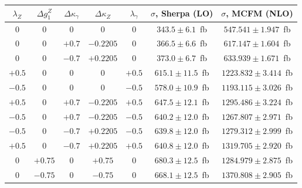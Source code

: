 \begin{table}[!ht]
  \begin{center}
  \begin{tabular} {|c c c|c c|c|c|}
\hline
  $\lambda_Z$ & $\Delta g^Z_1$ & $\Delta\kappa_{\gamma}$ & $\Delta\kappa_Z$ & $\lambda_{\gamma}$ & $\sigma$, Sherpa (LO) & $\sigma$, MCFM (NLO)\\
  \hline
  0           & 0              & 0                       & 0                & 0               &  $343.5\pm6.1$~fb  &  $547.541\pm1.947$~fb \\
  0           & 0              & $+0.7$                  & $-0.2205$        & 0               &  $366.5\pm6.6$~fb  &  $617.147\pm1.604$~fb \\
  0           & 0              & $-0.7$                  & $+0.2205$        & 0               &  $373.0\pm6.7$~fb  &  $633.939\pm1.671$~fb \\
  $+0.5$      & 0              & 0                       & 0                & $+0.5$          &  $615.1\pm11.5$~fb & $1223.832\pm3.414$~fb \\
  $-0.5$      & 0              & 0                       & 0                & $-0.5$          &  $578.0\pm10.9$~fb & $1193.115\pm3.026$~fb \\
  $+0.5$      & 0              & $+0.7$                  & $-0.2205$        & $+0.5$          &  $647.5\pm12.1$~fb & $1295.486\pm3.224$~fb \\
  $-0.5$      & 0              & $+0.7$                  & $-0.2205$        & $-0.5$          &  $640.2\pm12.0$~fb & $1267.807\pm2.971$~fb \\
  $-0.5$      & 0              & $-0.7$                  & $+0.2205$        & $-0.5$          &  $639.8\pm12.0$~fb & $1279.312\pm2.999$~fb \\
  $+0.5$      & 0              & $-0.7$                  & $+0.2205$        & $+0.5$          &  $640.8\pm12.0$~fb & $1319.705\pm2.920$~fb \\
  0           & $+0.75$        & 0                       & $+0.75$          & 0               &  $680.3\pm12.5$~fb & $1284.979\pm2.875$~fb \\
  0           & $-0.75$        & 0                       & $-0.75$          & 0               &  $668.1\pm12.5$~fb & $1370.808\pm2.905$~fb \\

\end{tabular}
\end{center}
\end{table}
